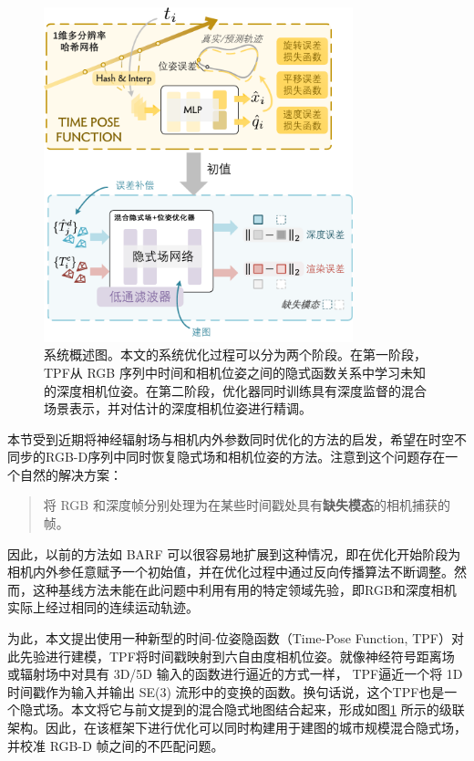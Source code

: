 \begin{figure}[t]
    \centering
    \includegraphics[width=0.8\textwidth]{undergraduate-thesis/images/time-pose function/main_export.pdf}
    \caption{系统概述图。本文的系统优化过程可以分为两个阶段。在第一阶段，TPF从 RGB 序列中时间和相机位姿之间的隐式函数关系中学习未知的深度相机位姿。在第二阶段，优化器同时训练具有深度监督的混合场景表示，并对估计的深度相机位姿进行精调。}
    \label{fig:time-pose function main figure}
\end{figure}

本节受到近期将神经辐射场与相机内外参数同时优化的方法\cite{yen-chen_inerf_2021, lin_barf_2021, bian_nope-nerf_2022}的启发，希望在时空不同步的RGB-D序列中同时恢复隐式场和相机位姿的方法。注意到这个问题存在一个自然的解决方案：
\begin{quote}
    将 RGB 和深度帧分别处理为在某些时间戳处具有\textbf{缺失模态}的相机捕获的帧。
\end{quote}

因此，以前的方法如 BARF\cite{lin_barf_2021} 可以很容易地扩展到这种情况，即在优化开始阶段为相机内外参任意赋予一个初始值，并在优化过程中通过反向传播算法不断调整。然而，这种基线方法未能在此问题中利用有用的特定领域先验，即RGB和深度相机实际上经过相同的连续运动轨迹。

为此，本文提出使用一种新型的时间-位姿隐函数（Time-Pose Function, TPF）对此先验进行建模，TPF将时间戳映射到六自由度相机位姿。就像神经符号距离场或辐射场中对具有 3D/5D 输入的函数进行逼近的方式一样， TPF逼近一个将 1D 时间戳作为输入并输出 SE(3) 流形\cite{sola_micro_2021}中的变换的函数。换句话说，这个TPF也是一个隐式场。本文将它与前文提到的混合隐式地图结合起来，形成如图\ref{fig:time-pose function main figure} 所示的级联架构。因此，在该框架下进行优化可以同时构建用于建图的城市规模混合隐式场，并校准 RGB-D 帧之间的不匹配问题。


